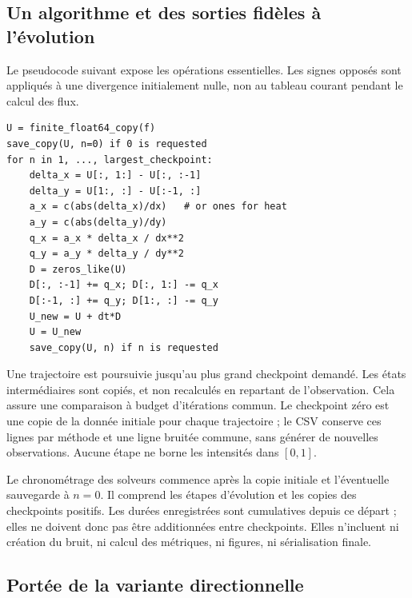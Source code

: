 \subsection{Un algorithme et des sorties fidèles à l'évolution}

Le pseudocode suivant expose les opérations essentielles. Les signes
opposés sont appliqués à une divergence initialement nulle, non au
tableau courant pendant le calcul des flux.

\begin{lstlisting}[basicstyle=\ttfamily\small,frame=single]
U = finite_float64_copy(f)
save_copy(U, n=0) if 0 is requested
for n in 1, ..., largest_checkpoint:
    delta_x = U[:, 1:] - U[:, :-1]
    delta_y = U[1:, :] - U[:-1, :]
    a_x = c(abs(delta_x)/dx)   # or ones for heat
    a_y = c(abs(delta_y)/dy)
    q_x = a_x * delta_x / dx**2
    q_y = a_y * delta_y / dy**2
    D = zeros_like(U)
    D[:, :-1] += q_x; D[:, 1:] -= q_x
    D[:-1, :] += q_y; D[1:, :] -= q_y
    U_new = U + dt*D
    U = U_new
    save_copy(U, n) if n is requested
\end{lstlisting}

Une trajectoire est poursuivie jusqu'au plus grand checkpoint demandé.
Les états intermédiaires sont copiés, et non recalculés en repartant
de l'observation. Cela assure une comparaison à budget d'itérations
commun. Le checkpoint zéro est une copie de la donnée initiale pour
chaque trajectoire ; le CSV conserve ces lignes par méthode et une
ligne bruitée commune, sans générer de nouvelles observations.
Aucune étape ne borne les intensités dans $[0,1]$.

Le chronométrage des solveurs commence après la copie initiale et
l'éventuelle sauvegarde à $n=0$. Il comprend les étapes d'évolution
et les copies des checkpoints positifs. Les durées enregistrées sont
cumulatives depuis ce départ ; elles ne doivent donc pas être
additionnées entre checkpoints. Elles n'incluent ni création du
bruit, ni calcul des métriques, ni figures, ni sérialisation finale.

\subsection{Portée de la variante directionnelle}

